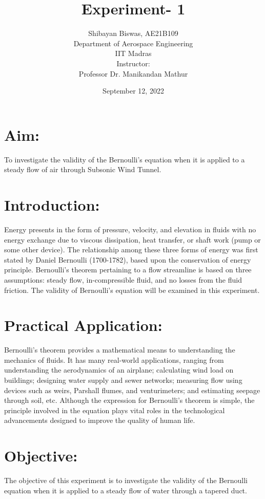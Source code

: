 \documentclass[12pt,a4paper]{article}
\title{Experiment- 1}
\author{Shibayan Biswas, AE21B109\\ Department of Aerospace Engineering\\ IIT Madras\\[3ex] Instructor:\\ \large Professor Dr. Manikandan Mathur}
\date{September 12, 2022}
\begin{document}
\maketitle
\hline
\section{Aim:}
To investigate the validity of the Bernoulli's equation when it is applied to a steady flow of air through Subsonic Wind Tunnel. 
\section{Introduction:}
Energy presents in the form of pressure, velocity, and elevation in fluids with no energy exchange due to viscous dissipation, heat transfer, or shaft work (pump or some other device). The relationship among these three forms of energy was first stated by Daniel Bernoulli (1700-1782), based upon the conservation of energy principle. Bernoulli’s theorem pertaining to a flow streamline is based on three assumptions: steady flow, in-compressible fluid, and no losses from the fluid friction. The validity of Bernoulli’s equation will be examined in this experiment.
\section{Practical Application:}
Bernoulli’s theorem provides a mathematical means to understanding the mechanics of fluids. It has many real-world applications, ranging from understanding the aerodynamics of an airplane; calculating wind load on buildings; designing water supply and sewer networks; measuring flow using devices such as weirs, Parshall flumes, and venturimeters; and estimating seepage through soil, etc. Although the expression for Bernoulli’s theorem is simple, the principle involved in the equation plays vital roles in the technological advancements designed to improve the quality of human life.
\section{Objective:}
The objective of this experiment is to investigate the validity of the Bernoulli equation when it is applied to a steady flow of water through a tapered duct.
\end{document}
